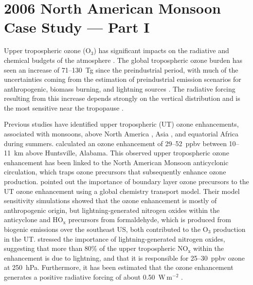 \chapter{2006 North American Monsoon Case Study --- Part I} \label{ch:2006}

\ifpdf
    \graphicspath{{Chapter_2006/figures/PNG/}{Chapter_2006/figures/PDF/}{Chapter_2006/}}
\else
    \graphicspath{{Chapter_2006/figures/EPS/}{Chapter_2006/}}
\fi

Upper tropospheric ozone (O$_3$) has significant impacts on the radiative and chemical budgets of
the atmosphere \citep{Kiehl:1999uq}. The global tropospheric ozone burden has seen an
increase of 71--130~Tg since the preindustrial period, with much of the uncertainties
coming from the estimation of preindustrial emission scenarios for anthropogenic, biomass
burning, and lightning sources \citep[][and references therein]{Lamarque:2005gb}. The
radiative forcing resulting from this increase depends strongly on the vertical distribution and
is the most sensitive near the tropopause \citep{Lacis:1990fk}.

Previous studies have identified upper tropospheric (UT) ozone enhancements, associated with monsoons, above North America
\citep[][and references therein]{Li:2005ss,Cooper:2009nx}, Asia \citep{Park:2007bh,Worden:2009ve},
and equatorial Africa \citep{Bouarar:2011ly} during summers.
\citet{Cooper:2007cr} calculated an ozone enhancement of 29--52~ppbv between 10--11~km
above Huntsville, Alabama. This observed upper tropospheric ozone enhancement has
been linked to the North American Monsoon anticyclonic circulation, which traps ozone
precursors that subsequently enhance ozone production. \citet{Li:2005ss} pointed out the importance
of boundary layer ozone precursors to the UT ozone enhancement using a global chemistry transport model.
Their model sensitivity simulations showed that the ozone enhancement is mostly of anthropogenic origin,
but lightning-generated nitrogen oxides within the anticyclone and $\mathrm{HO_x}$ precursors from
formaldehyde, which is produced from biogenic emissions over the southeast US, both contributed to the
O$_3$ production in the UT. \citet{Cooper:2009nx} stressed the importance of lightning-generated nitrogen
oxides, suggesting that more than 80\% of the upper tropospheric NO$_\mathrm{x}$ within the enhancement
is due to lightning, and that it is responsible for 25--30~ppbv ozone at 250~hPa. Furthermore,
it has been estimated that the ozone enhancement generates a positive radiative forcing of about
0.50~W\,m$^{-2}$ \citep{Cooper:2007cr,Choi:2009bh}.

